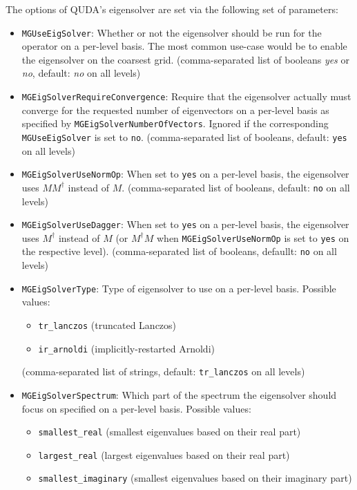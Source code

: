 The options of QUDA's eigensolver are set via the following set of parameters:
\begin{itemize}
  \item{ \texttt{MGUseEigSolver}: Whether or not the eigensolver should be run for the operator on a per-level basis. The most common use-case would be to enable the eigensolver on the coarsest grid. (comma-separated list of booleans \emph{yes} or \emph{no}, default: \emph{no} on all levels)}
  \item{ \texttt{MGEigSolverRequireConvergence}: Require that the eigensolver actually must converge for the requested number of eigenvectors on a per-level basis as specified by \texttt{MGEigSolverNumberOfVectors}. Ignored if the corresponding \texttt{MGUseEigSolver} is set to \texttt{no}. (comma-separated list of booleans, default: \texttt{yes} on all levels)}
  \item{ \texttt{MGEigSolverUseNormOp}: When set to \texttt{yes} on a per-level basis, the eigensolver uses $MM^\dagger$ instead of $M$. (comma-separated list of booleans, default: \texttt{no} on all levels)}
  \item{ \texttt{MGEigSolverUseDagger}: When set to \texttt{yes} on a per-level basis, the eigensolver uses $M^\dagger$ instead of $M$ (or $M^\dagger M$ when \texttt{MGEigSolverUseNormOp} is set to \texttt{yes} on the respective level). (comma-separated list of booleans, defaullt: \texttt{no} on all levels)}
  \item{ \texttt{MGEigSolverType}: Type of eigensolver to use on a per-level basis. Possible values:
    \begin{itemize}
      \item \texttt{tr\_lanczos} (truncated Lanczos)
      \item \texttt{ir\_arnoldi} (implicitly-restarted Arnoldi)
    \end{itemize}
    (comma-separated list of strings, default: \texttt{tr\_lanczos} on all levels)}
  \item{ \texttt{MGEigSolverSpectrum}: Which part of the spectrum the eigensolver should focus on specified on a per-level basis. Possible values:
    \begin{itemize}
      \item \texttt{smallest\_real} (smallest eigenvalues based on their real part)
      \item \texttt{largest\_real} (largest eigenvalues based on their real part)
      \item \texttt{smallest\_imaginary} (smallest eigenvalues based on their imaginary part)

\end{itemize}}
\end{itemize}
